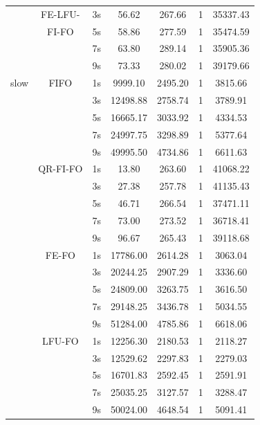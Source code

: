 \begin{center}
\begin{longtable}{|c||c||c|c|c|c|c|}
			   & FE-LFU-   & 3s & 56.62 & 267.66 & 1 & 35337.43\\ \cline{3-7}
			   & FI-FO     & 5s & 58.86 & 277.59 & 1 & 35474.59\\ \cline{3-7}
			   &           & 7s & 63.80 & 289.14 & 1 & 35905.36\\ \cline{3-7}
			   &           & 9s & 73.33 & 280.02 & 1 & 39179.66\\ \hhline{|=#=#=|=|=|=|=|}
        slow  & FIFO & 1s & 9999.10 & 2495.20 & 1 & 3815.66 \\ \cline{3-7}
			  &	     & 3s & 12498.88 & 2758.74 & 1 & 3789.91 \\ \cline{3-7}
			  &      & 5s & 16665.17 & 3033.92 & 1 & 4334.53 \\ \cline{3-7}
			  &      & 7s & 24997.75 & 3298.89 & 1 & 5377.64 \\ \cline{3-7}
			  &      & 9s & 49995.50 & 4734.86 & 1 & 6611.63 \\ \cline{2-7}
			  & QR-FI-FO & 1s & 13.80 & 263.60 & 1 & 41068.22 \\ \cline{3-7}
			  &		     & 3s & 27.38 & 257.78 & 1 & 41135.43 \\ \cline{3-7}
			  &          & 5s & 46.71 & 266.54 & 1 & 37471.11 \\ \cline{3-7}
			  &          & 7s & 73.00 & 273.52 & 1 & 36718.41 \\ \cline{3-7}
			  &          & 9s & 96.67 & 265.43 & 1 & 39118.68 \\ \cline{2-7}
			  & FE-FO & 1s & 17786.00 & 2614.28 & 1 & 3063.04 \\ \cline{3-7}
			  &		  & 3s & 20244.25 & 2907.29 & 1 & 3336.60 \\ \cline{3-7}
			  &       & 5s & 24809.00 & 3263.75 & 1 & 3616.50 \\ \cline{3-7}
			  &       & 7s & 29148.25 & 3436.78 & 1 & 5034.55 \\ \cline{3-7}
			  &       & 9s & 51284.00 & 4785.86 & 1 & 6618.06 \\ \cline{2-7}
			  & LFU-FO & 1s & 12256.30 & 2180.53 & 1 & 2118.27\\ \cline{3-7}
			  &		   & 3s & 12529.62 & 2297.83 & 1 & 2279.03 \\ \cline{3-7}
			  &        & 5s & 16701.83 & 2592.45 & 1 & 2591.91 \\ \cline{3-7}
			  &        & 7s & 25035.25 & 3127.57 & 1 & 3288.47 \\ \cline{3-7}
			  &        & 9s & 50024.00 & 4648.54 & 1 & 5091.41 \\ \cline{2-7}

\end{longtable}
\end{center}

